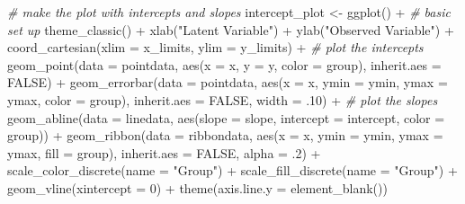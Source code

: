 \documentclass[
  man]{apa6}
\newenvironment{Shaded}{\begin{snugshade}}{\end{snugshade}}
\newcommand{\AttributeTok}[1]{\textcolor[rgb]{0.77,0.63,0.00}{#1}}
\newcommand{\CommentTok}[1]{\textcolor[rgb]{0.56,0.35,0.01}{\textit{#1}}}
\newcommand{\ConstantTok}[1]{\textcolor[rgb]{0.00,0.00,0.00}{#1}}
\newcommand{\DecValTok}[1]{\textcolor[rgb]{0.00,0.00,0.81}{#1}}
\newcommand{\FunctionTok}[1]{\textcolor[rgb]{0.00,0.00,0.00}{#1}}
\newcommand{\NormalTok}[1]{#1}
\newcommand{\OtherTok}[1]{\textcolor[rgb]{0.56,0.35,0.01}{#1}}
\newcommand{\SpecialCharTok}[1]{\textcolor[rgb]{0.00,0.00,0.00}{#1}}
\newcommand{\StringTok}[1]{\textcolor[rgb]{0.31,0.60,0.02}{#1}}
\begin{document}
\begin{Shaded}
\begin{Highlighting}[]
  \CommentTok{\# make the plot with intercepts and slopes}
\NormalTok{  intercept\_plot }\OtherTok{\textless{}{-}} 
  \FunctionTok{ggplot}\NormalTok{() }\SpecialCharTok{+} 
  \CommentTok{\# basic set up}
  \FunctionTok{theme\_classic}\NormalTok{() }\SpecialCharTok{+} 
  \FunctionTok{xlab}\NormalTok{(}\StringTok{"Latent Variable"}\NormalTok{) }\SpecialCharTok{+} 
  \FunctionTok{ylab}\NormalTok{(}\StringTok{"Observed Variable"}\NormalTok{) }\SpecialCharTok{+} 
  \FunctionTok{coord\_cartesian}\NormalTok{(}\AttributeTok{xlim =}\NormalTok{ x\_limits, }\AttributeTok{ylim =}\NormalTok{ y\_limits) }\SpecialCharTok{+} 
  \CommentTok{\# plot the intercepts }
  \FunctionTok{geom\_point}\NormalTok{(}\AttributeTok{data =}\NormalTok{ pointdata, }
             \FunctionTok{aes}\NormalTok{(}\AttributeTok{x =}\NormalTok{ x, }\AttributeTok{y =}\NormalTok{ y, }\AttributeTok{color =}\NormalTok{ group), }
             \AttributeTok{inherit.aes =} \ConstantTok{FALSE}\NormalTok{) }\SpecialCharTok{+} 
  \FunctionTok{geom\_errorbar}\NormalTok{(}\AttributeTok{data =}\NormalTok{ pointdata,}
                \FunctionTok{aes}\NormalTok{(}\AttributeTok{x =}\NormalTok{ x, }\AttributeTok{ymin =}\NormalTok{ ymin, }\AttributeTok{ymax =}\NormalTok{ ymax, }\AttributeTok{color =}\NormalTok{ group), }
                \AttributeTok{inherit.aes =} \ConstantTok{FALSE}\NormalTok{, }\AttributeTok{width =}\NormalTok{ .}\DecValTok{10}\NormalTok{) }\SpecialCharTok{+} 
  \CommentTok{\# plot the slopes}
  \FunctionTok{geom\_abline}\NormalTok{(}\AttributeTok{data =}\NormalTok{ linedata,}
              \FunctionTok{aes}\NormalTok{(}\AttributeTok{slope =}\NormalTok{ slope, }\AttributeTok{intercept =}\NormalTok{ intercept, }\AttributeTok{color =}\NormalTok{ group)) }\SpecialCharTok{+} 
  \FunctionTok{geom\_ribbon}\NormalTok{(}\AttributeTok{data =}\NormalTok{ ribbondata, }
              \FunctionTok{aes}\NormalTok{(}\AttributeTok{x =}\NormalTok{ x, }\AttributeTok{ymin =}\NormalTok{ ymin, }\AttributeTok{ymax =}\NormalTok{ ymax, }\AttributeTok{fill =}\NormalTok{ group), }
              \AttributeTok{inherit.aes =} \ConstantTok{FALSE}\NormalTok{, }\AttributeTok{alpha =}\NormalTok{ .}\DecValTok{2}\NormalTok{) }\SpecialCharTok{+} 
  \FunctionTok{scale\_color\_discrete}\NormalTok{(}\AttributeTok{name =} \StringTok{"Group"}\NormalTok{) }\SpecialCharTok{+} 
  \FunctionTok{scale\_fill\_discrete}\NormalTok{(}\AttributeTok{name =} \StringTok{"Group"}\NormalTok{) }\SpecialCharTok{+} 
  \FunctionTok{geom\_vline}\NormalTok{(}\AttributeTok{xintercept =} \DecValTok{0}\NormalTok{) }\SpecialCharTok{+} 
  \FunctionTok{theme}\NormalTok{(}\AttributeTok{axis.line.y =} \FunctionTok{element\_blank}\NormalTok{())}
  

\end{Highlighting}
\end{Shaded}
\end{document}
